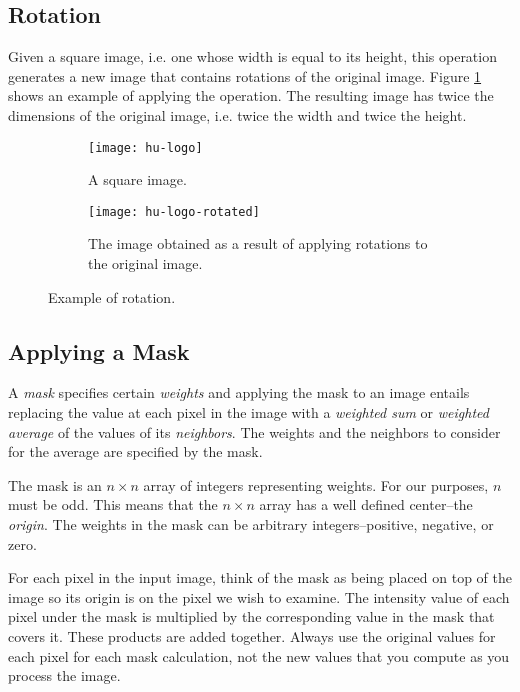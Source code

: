 \documentclass[addpoints]{exam}
\begin{document}
\subsection{Rotation}

Given a square image, i.e. one whose width is equal to its height, this operation generates a new image that contains rotations of the original image. Figure \ref{fig:rotate} shows an example of applying the operation. The resulting image has twice the dimensions of the original image, i.e. twice the width and twice the height.

\begin{figure}
  \centering
  \begin{subfigure}{.2\textwidth}
    \texttt{[image: hu-logo]}
    \caption{A square image.}
  \end{subfigure}
  \begin{subfigure}[c]{.35\textwidth}
    \texttt{[image: hu-logo-rotated]}
    \caption{The image obtained as a result of applying rotations to the original image.}
  \end{subfigure}
  \caption{Example of rotation.}
  \label{fig:rotate}
\end{figure}

\subsection{Applying a Mask}

A \textit{mask} specifies certain \textit{weights} and applying the mask to an image entails replacing the value at each pixel in the image with a \textit{weighted sum} or \textit{weighted average} of the values of its \textit{neighbors}. The weights and the neighbors to consider for the average are specified by the mask.

The  mask is an $n \times n$ array of integers representing weights. For our purposes, $n$ must be odd. This means that the $n \times n$ array has a well defined center--the \textit{origin}. The weights in the mask can be arbitrary integers--positive, negative, or zero.

For each pixel in the input image, think of the mask as being placed on top of the image so its origin is on the pixel we wish to examine. The intensity value of each pixel under the mask is multiplied by the corresponding value in the mask that covers it. These products are added together. Always use the original values for each pixel for each mask calculation, not the new values that you compute as you process the image.
\end{document}
